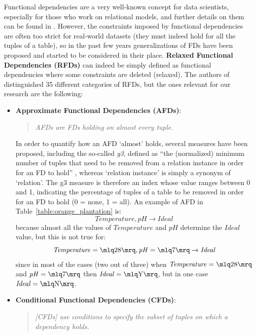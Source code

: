 Functional dependencies are a very well-known concept for data scientists, especially for those who work on relational models, and further details on them can be found in \cite{abiteboul1995foundations}.
However, the constraints imposed by functional dependencies are often too strict for real-world datasets (they must indeed hold for all the tuples of a table), so in the past few years generalizations of FDs have been proposed and started to be considered in their place. \textbf{Relaxed Functional Dependencies (RFDs)} can indeed be simply defined as functional dependencies where some constraints are deleted (relaxed). The authors of \cite{caruccio2015relaxed} distinguished 35 different categories of RFDs, but the ones relevant for our research are the following:
\begin{itemize}
\item \textbf{Approximate Functional Dependencies (AFDs)}:
\begin{quote}\emph{AFDs are FDs holding on almost every tuple.} \cite[p.~151]{caruccio2015relaxed}\end{quote}
In order to quantify how an AFD `almost' holds, several measures have been proposed, including the so-called \textit{g3}, defined as ``the (normalized) minimum number of tuples that need to be removed from a relation instance in order for an FD to hold'' \cite[p.~151]{caruccio2015relaxed}, whereas `relation instance' is simply a synonym of `relation'. The g3 measure is therefore an index whose value ranges between 0 and 1, indicating the percentage of tuples of a table to be removed in order for an FD to hold (0 = none, 1 = all). An example of AFD in Table~\ref{table:orange_plantation} is: \[\mathit{Temperature}, \mathit{pH} \rightarrow \mathit{Ideal}\] because almost all the values of \(\mathit{Temperature}\) and \(\mathit{pH}\) determine the \(\mathit{Ideal}\) value, but this is not true for: \[\mathit{Temperature} = \mlq 28 \mrq, \mathit{pH} = \mlq 7 \mrq \rightarrow \mathit{Ideal}\] since in most of the cases (two out of three) when \(\mathit{Temperature} = \mlq 28 \mrq\) and \(\mathit{pH} = \mlq 7 \mrq\) then \(\mathit{Ideal} = \mlq \mathrm{Y} \mrq\), but in one case \(\mathit{Ideal} = \mlq \mathrm{N} \mrq\).
\item \textbf{Conditional Functional Dependencies (CFDs)}:
\begin{quote}\emph{\emph{[CFDs]} use conditions to specify the subset of tuples on which a dependency holds.} \cite[p.~152]{caruccio2015relaxed}\end{quote}

\end{itemize}
